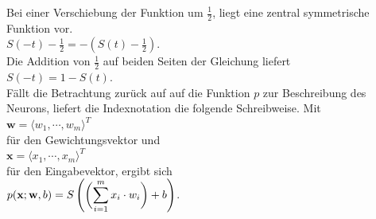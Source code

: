\noindent
Bei einer Verschiebung der Funktion um $\frac{1}{2}$, liegt eine zentral symmetrische Funktion vor. \\[0.2cm]
\hspace*{1.3cm}
$S(-t)-\frac{1}{2}=-\left(S(t)-\frac{1}{2}\right)$.
\\[0.2cm]
Die Addition von $\frac{1}{2}$ auf beiden Seiten der Gleichung liefert \\[0.2cm]
\hspace*{1.3cm}
$S(-t)=1-S(t)$.
\\[0.2cm]
Fällt die Betrachtung zurück auf auf die Funktion $p$ zur Beschreibung des Neurons, liefert die Indexnotation die folgende Schreibweise. Mit \\[0.2cm]
\hspace*{1.3cm}
$\mathbf{w}=\langle w_1,\cdots ,w_m\rangle^T$
\\[0.2cm]
für den Gewichtungsvektor und \\[0.2cm]
\hspace*{1.3cm}
$\mathbf{x}=\langle x_1,\cdots ,x_m\rangle^T$
\\[0.2cm]
für den Eingabevektor, ergibt sich \\[0.2cm]
\hspace*{1.3cm}
$\displaystyle p(\mathbf{x}; \mathbf{w}, b) = S\left(\biggl(\sum\limits_{i=1}^m x_i \cdot w_i\biggr) + b\right)$.
\\[0.2cm]


